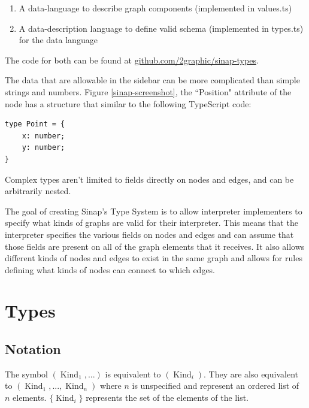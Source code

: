 \documentclass{article}
\begin{document}
\begin{enumerate}
    \item A data-language to describe graph components 
    (implemented in values.ts)
    \item A data-description language to define valid schema 
    (implemented in types.ts)
    for the data language
\end{enumerate}

The code for both can be found at 
\href{https://github.com/2graphic/sinap-types}
{github.com/2graphic/sinap-types}.

The data that are allowable in the sidebar can be more complicated than
simple strings and numbers. Figure \ref{sinap-screenshot}, the ``Position" attribute
of the node has a structure that similar to the following TypeScript code:

\begin{samepage}
\begin{verbatim}
type Point = {
    x: number;
    y: number;
}
\end{verbatim}
\end{samepage}

Complex types aren't limited to fields directly on nodes and edges,
and can be arbitrarily nested. 

The goal of creating Sinap's Type System is to allow interpreter 
implementers to specify what 
kinds of graphs are valid for their interpreter. This means that 
the interpreter specifies the various fields on nodes and edges 
and can assume that those fields are present on all of the graph elements
that it receives. It also allows different kinds of nodes and edges to
exist in the same graph and allows for rules defining what kinds of
nodes can connect to which edges. 

\section{Types}

\subsection{Notation}

The symbol \((\operatorname{Kind}_1, ...)\) is equivalent to 
\((\operatorname{Kind}_i)\). They are also equivalent to 
\((\operatorname{Kind}_1, ..., \operatorname{Kind}_n)\)
where \(n\) is unspecified and represent an ordered list 
of \(n\) elements. \(\{\operatorname{Kind}_i\}\) represents 
the set of the elements of the list. 
\end{document}
